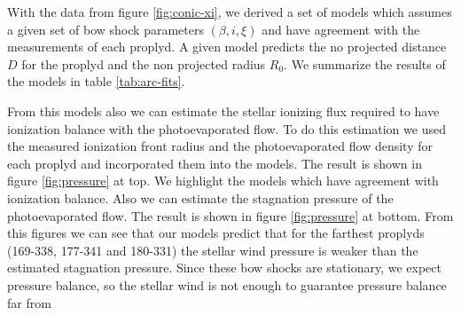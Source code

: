 With the data from figure \ref{fig:conic-xi}, we derived a set of models which assumes a given set of bow shock parameters $(\beta, i,\xi)$ and have agreement with the measurements of each proplyd. A given model predicts the no projected
distance $D$ for the proplyd and the non projected radius $R_0$. We summarize the results of the models in table \ref{tab:arc-fits}.

From this models also we can estimate the stellar ionizing flux required to have ionization balance with the photoevaporated flow. To do this estimation we used the measured ionization front radius and the photoevaporated flow density for each proplyd
and incorporated them into the models. The result is shown in figure \ref{fig:pressure} at top. We highlight the models which have agreement with ionization balance.
Also we can estimate the stagnation pressure of the photoevaporated flow. The result is shown in figure \ref{fig:pressure} at bottom. 
From this figures we can see that our models predict that for the farthest proplyds (169-338, 177-341 and 180-331) the stellar wind pressure is weaker than the estimated stagnation pressure. Since these bow shocks are stationary, we expect pressure
balance, so the stellar wind is not enough to guarantee pressure balance far from \thC{}



 

